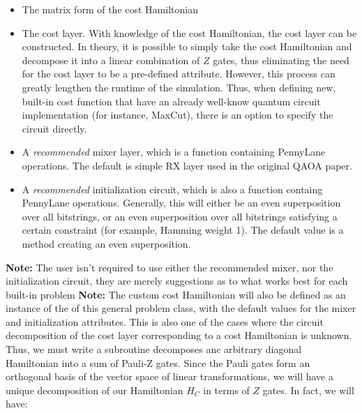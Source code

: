 \documentclass{article}
\begin{document}
   \begin{itemize}

	   \item The matrix form of the cost Hamiltonian
	   \item The cost layer. With knowledge of the cost Hamiltonian, the cost 
   		 layer can be constructed. In theory, it is possible to simply 
		 take the cost Hamiltonian and decompose it into a linear combination of 
		 $Z$ gates, thus eliminating the need for the cost layer to be a pre-defined attribute. 
		 However, this process can greatly lengthen the runtime of the simulation. 
		 Thus, when defining new, built-in cost function that have an already well-know 
		 quantum circuit implementation (for instance, MaxCut), there is an option to specify the circuit
		 directly.
	   \item A \textit{recommended} mixer layer, which is a function containing
                 PennyLane operations. The default is simple RX layer used in the original QAOA paper.
	   \item A \textit{recommended} initialization circuit, which is also a function 
                 containg PennyLane operations. Generally, this will either be an 
   		 even superposition over all bitstrings, or an even superposition over all 
   		 bitstrings satisfying a certain constraint (for example, Hamming weight 1).
   		 The default value is a method creating an even superposition.
   \end{itemize}

\noindent
\textbf{Note:} The user isn't required to use either the recommended mixer, nor the
initialization circuit, they are merely suggestions as to what works best 
for each built-in problem
\newline\newline
\noindent
\textbf{Note:} The custom cost Hamiltonian will also be defined as an instance of the of
this general problem class, with the default values for the mixer and initialization 
attributes. 
\newline\newline
\noindent
This is also one of the cases where the circuit decomposition of the cost layer corresponding to a cost 
Hamiltonian is unknown. Thus, we must write a subroutine decomposes anc arbitrary diagonal Hamiltonian into a sum 
of Pauli-Z gates. Since the Pauli gates form an orthogonal
basis of the vector space of linear transformations, we will have a unique decomposition
of our Hamiltonian $H_C$ in terms of $Z$ gates. In fact, we will have:
\end{document}
